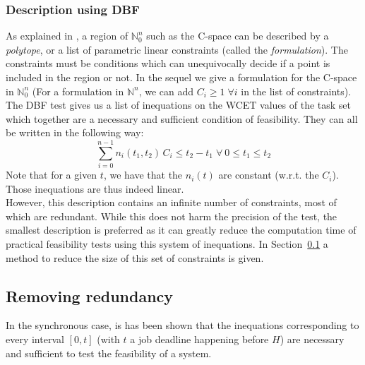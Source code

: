 \documentclass[conference]{IEEEtran}
\begin{document}

    \subsubsection{Description using DBF}
      \label{sct:cspaceDescr}

      As explained in \cite{nemhauser1988integer}, a region of $\mathbb{N}_0^n$ such as the C-space can be described by a \emph{polytope}, or a list of parametric linear constraints (called the \emph{formulation}). The constraints must be conditions which can unequivocally decide if a point is included in the region or not. In the sequel we give a formulation for the C-space in $\mathbb{N}_0^n$ (For a formulation in $\mathbb{N}^n$, we can add $C_i \geqslant 1 \; \forall i$ in the list of constraints).\\

      The DBF test gives us a list of inequations on the WCET values of the task set which together are a necessary and sufficient condition of feasibility. They can all be written in the following way:
      \[
        \sum_{i=0}^{n-1} n_i(t_1, t_2) \, C_i \leq t_2 - t_1 \; \forall \: 0 \leq t_1 \leq t_2
      \]
      Note that for a given $t$, we have that the $n_i(t)$ are
      constant (w.r.t. the $C_i$). Those inequations are thus indeed linear.\\

      However, this description contains an infinite number of constraints, most of
      which are redundant. While this does not harm the precision of the
      test, the smallest description is preferred as it can greatly
      reduce the computation time of practical feasibility tests using this system
      of inequations. In Section~\ref{sct:removeRedundancy} a method to reduce the size of this set of constraints is given.

  \subsection{Removing redundancy}
    \label{sct:removeRedundancy}

  In the synchronous case, is has been shown that the inequations corresponding
  to every interval $[0, t]$ (with $t$ a job deadline happening before $H$) are
  necessary and sufficient to test the feasibility of a system.\\
\end{document}
